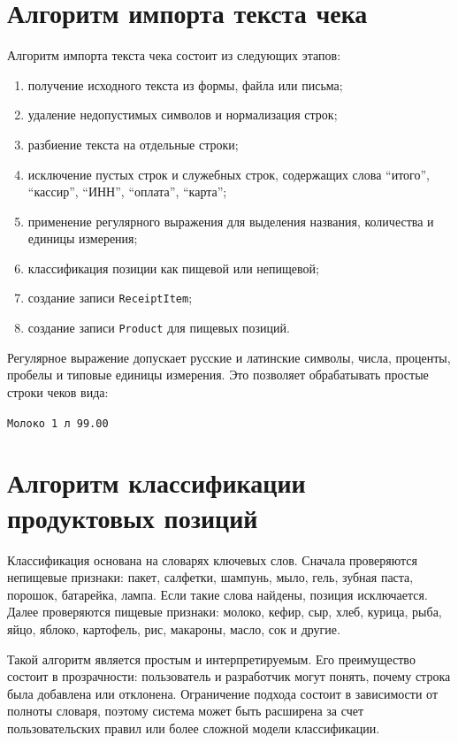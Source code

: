 \documentclass[14pt,a4paper]{extreport}
\begin{document}
\section{Алгоритм импорта текста чека}

Алгоритм импорта текста чека состоит из следующих этапов:
\begin{enumerate}
  \item получение исходного текста из формы, файла или письма;
  \item удаление недопустимых символов и нормализация строк;
  \item разбиение текста на отдельные строки;
  \item исключение пустых строк и служебных строк, содержащих слова ``итого'', ``кассир'', ``ИНН'', ``оплата'', ``карта'';
  \item применение регулярного выражения для выделения названия, количества и единицы измерения;
  \item классификация позиции как пищевой или непищевой;
  \item создание записи \texttt{ReceiptItem};
  \item создание записи \texttt{Product} для пищевых позиций.
\end{enumerate}

Регулярное выражение допускает русские и латинские символы, числа, проценты, пробелы и типовые единицы измерения. Это позволяет обрабатывать простые строки чеков вида:
\begin{center}
\texttt{Молоко 1 л 99.00}
\end{center}

\section{Алгоритм классификации продуктовых позиций}

Классификация основана на словарях ключевых слов. Сначала проверяются непищевые признаки: пакет, салфетки, шампунь, мыло, гель, зубная паста, порошок, батарейка, лампа. Если такие слова найдены, позиция исключается. Далее проверяются пищевые признаки: молоко, кефир, сыр, хлеб, курица, рыба, яйцо, яблоко, картофель, рис, макароны, масло, сок и другие.

Такой алгоритм является простым и интерпретируемым. Его преимущество состоит в прозрачности: пользователь и разработчик могут понять, почему строка была добавлена или отклонена. Ограничение подхода состоит в зависимости от полноты словаря, поэтому система может быть расширена за счет пользовательских правил или более сложной модели классификации.
\end{document}
